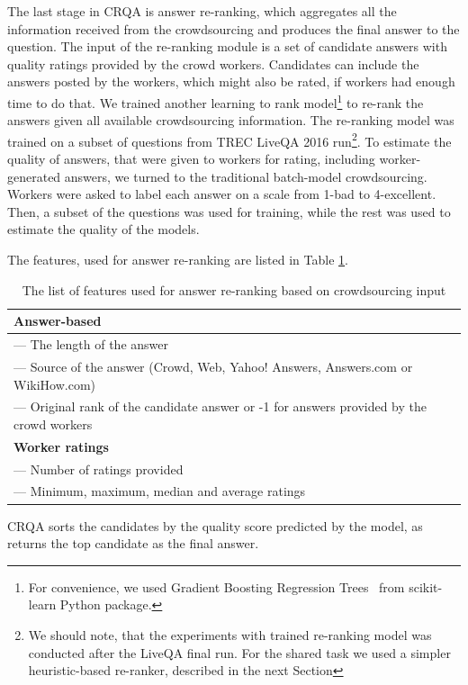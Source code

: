 The last stage in CRQA is answer re-ranking, which aggregates all the information received from the crowdsourcing and produces the final answer to the question.
The input of the re-ranking module is a set of candidate answers with quality ratings provided by the crowd workers.
Candidates can include the answers posted by the workers, which might also be rated, if workers had enough time to do that.
We trained another learning to rank model\footnote{For convenience, we used Gradient Boosting Regression Trees~\cite{friedman2002stochastic} from scikit-learn Python package.} to re-rank the answers given all available crowdsourcing information.
The re-ranking model was trained on a subset of questions from TREC LiveQA 2016 run\footnote{We should note, that the experiments with trained re-ranking model was conducted after the LiveQA final run. For the shared task we used a simpler heuristic-based re-ranker, described in the next Section}.
To estimate the quality of answers, that were given to workers for rating, including worker-generated answers, we turned to the traditional batch-model crowdsourcing.
Workers were asked to label each answer on a scale from 1-bad to 4-excellent.
Then, a subset of the questions was used for training, while the rest was used to estimate the quality of the models.

The features, used for answer re-ranking are listed in Table \ref{table:reranking_features}.

\begin{table}[ht]
\centering
\begin{tabular}{| p{8cm} |}
\hline
\textbf{Answer-based} \\
\hline
--- The length of the answer \\
--- Source of the answer (Crowd, Web, Yahoo! Answers, Answers.com or WikiHow.com)\\
--- Original rank of the candidate answer or -1 for answers provided by the crowd workers\\
\hline
\textbf{Worker ratings} \\
\hline
--- Number of ratings provided\\
--- Minimum, maximum, median and average ratings\\
\hline
\end{tabular}
\caption{The list of features used for answer re-ranking based on crowdsourcing input}
\label{table:reranking_features}
\end{table}

CRQA sorts the candidates by the quality score predicted by the model, as returns the top candidate as the final answer.

